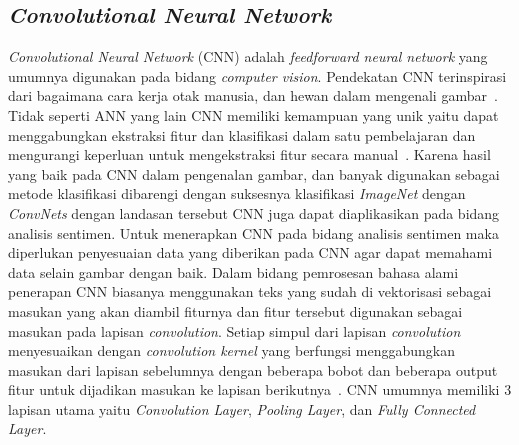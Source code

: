 \subsection{\emph{Convolutional Neural Network}}\label{CNN}
\emph{Convolutional Neural Network} (CNN) adalah \emph{feedforward neural network} yang umumnya
digunakan pada bidang \emph{computer vision}. Pendekatan CNN terinspirasi dari bagaimana cara kerja
otak manusia, dan hewan dalam mengenali gambar~\citep{Zhang2018}. Tidak seperti ANN yang lain CNN memiliki
kemampuan yang unik yaitu dapat menggabungkan ekstraksi fitur dan klasifikasi dalam satu pembelajaran
dan mengurangi keperluan untuk mengekstraksi fitur secara manual~\citep{Kiranyaz2019}. Karena hasil yang baik pada CNN
dalam pengenalan gambar, dan banyak digunakan sebagai metode klasifikasi dibarengi dengan suksesnya
klasifikasi \emph{ImageNet} dengan \emph{ConvNets} dengan landasan tersebut CNN juga dapat diaplikasikan pada
bidang analisis sentimen. Untuk menerapkan CNN pada bidang analisis sentimen maka diperlukan
penyesuaian data yang diberikan pada CNN agar dapat memahami data selain gambar dengan baik. Dalam
bidang pemrosesan bahasa alami penerapan CNN biasanya menggunakan teks yang sudah di vektorisasi sebagai
masukan yang akan diambil fiturnya dan fitur tersebut digunakan sebagai masukan pada lapisan \emph{convolution}.
Setiap simpul dari lapisan \emph{convolution} menyesuaikan dengan \emph{convolution kernel}
yang berfungsi menggabungkan masukan dari lapisan sebelumnya dengan beberapa bobot dan beberapa output
fitur untuk dijadikan masukan ke lapisan berikutnya~\citep{Wu2019}. CNN umumnya memiliki 3 lapisan
utama yaitu \emph{Convolution Layer}, \emph{Pooling Layer}, dan \emph{Fully Connected Layer}.

